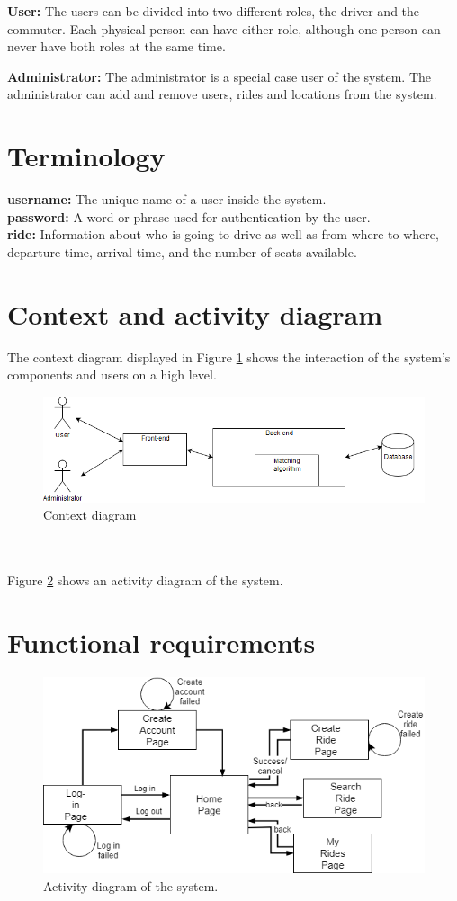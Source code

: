 \documentclass{article}
\begin{document}
\textbf{User:} The users can be divided into two different roles, the driver and the commuter. Each physical person can have either role, although one person can never have both roles at the same time.

\textbf{Administrator:} The administrator is a special case user of the system. The administrator can add and remove users, rides and locations from the system. 

\section{Terminology}
\textbf{username:} The unique name of a user inside the system.
\\
\textbf{password:} A word or phrase used for authentication by the user.
\\
\textbf{ride:} Information about who is going to drive as well as from where to where, departure time, arrival time, and the number of seats available.

\section{Context and activity diagram}
The context diagram displayed in Figure \ref{fig:context} shows the interaction of the system's components and users on a high level.
\begin{figure}
  \centering
  \includegraphics[scale=0.45]{Contextdiagram.png}
  \caption{Context diagram}
  \label{fig:context}
\end{figure}
\\ \\ 
Figure \ref{fig:activity} shows an activity diagram of the system.
\section{Functional requirements}

\begin{figure}
  \centering
  \includegraphics[scale=0.6]{forSRS.png}
  \caption{Activity diagram of the system.}
  \label{fig:activity}
\end{figure}
\end{document}
